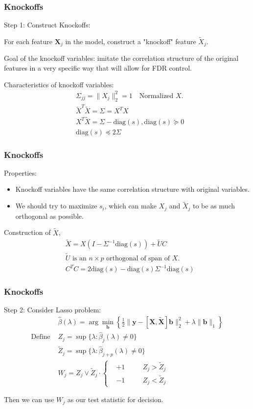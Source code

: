 \documentclass{beamer}
\begin{document}
\begin{frame}
\frametitle{Knockoffs}
Step 1: Construct Knockoffs:

For each feature $\bm{X}_j$ in the model, construct a "knockoff" feature $\tilde{X}_j$. 

Goal of the knockoff variables: imitate the correlation structure of the original features in a very specific way that will allow for FDR control.

Characteristics of knockoff variables: 
\begin{align*}
& \Sigma_{jj} = \|X_j\|_2^2 = 1 \quad \text{Normalized }X.\\
& \tilde{X}^T\tilde{X}=\Sigma = X^TX \\
& X^T\tilde{X} = \Sigma - \text{diag}(s), \text{diag}(s) \succeq 0 \\
& \text{diag}(s) \preceq 2\Sigma
\end{align*}

\end{frame}

\begin{frame}
\frametitle{Knockoffs}
Properties:
\begin{itemize}
	\item Knockoff variables have the same correlation structure with original variables.
	\item We should try to maximize $s_i$, which can make $X_j$ and $\tilde{X}_j$ to be as much orthogonal as possible.
\end{itemize}
Construction of $\tilde{X}$,
\begin{align*}
& \tilde{X} = X(I - \Sigma^{-1} \text{diag}(s))+\tilde{U}C\\
& \tilde{U} \text{ is an }n\times p\text{ orthogonal of span of }X.\\
& C^TC = 2\text{diag}(s)-\text{diag}(s)\Sigma^{-1}\text{diag}(s)
\end{align*}
\end{frame}

\begin{frame}
\frametitle{Knockoffs}
Step 2: Consider Lasso problem:
\begin{align*}
& \hat{\beta}(\lambda) = \arg\min_{\textbf{b}} \left\{\frac{1}{2}\|\bm{y}- [\bm{X}, \tilde{\bm{X}}]\bm{b}\|_2^2 + \lambda\|\bm{b}\|_1 \right\}\\
\text{Define }& Z_j = \sup\{\lambda: \hat{\beta}_j(\lambda) \neq 0 \} \\
& \tilde{Z}_j = \sup\{\lambda: \hat{\beta}_{j+p}(\lambda) \neq 0 \} \\
& W_j = Z_j \vee \tilde{Z}_j \cdot\left\{\begin{aligned}
& +1 && \quad Z_j > \tilde{Z}_j \\ & -1 && \quad Z_j < \tilde{Z}_j
\end{aligned} \right.
\end{align*}

Then we can use $W_j$ as our test statistic for decision. 
\end{frame}
\end{document}
